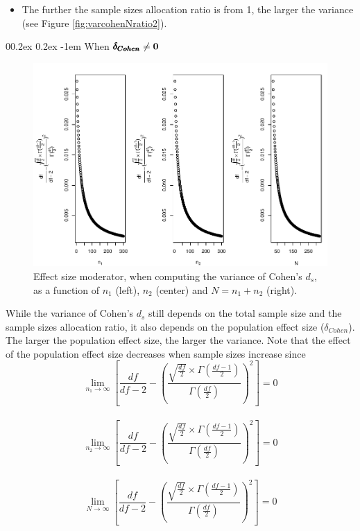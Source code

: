 \documentclass[
  english,
  man]{apa6}
\makeatletter
\providecommand{\tightlist}{%
  \setlength{\itemsep}{0pt}\setlength{\parskip}{0pt}}
\let\oldparagraph\paragraph
\renewcommand{\paragraph}[1]{\oldparagraph{#1}\mbox{}}
\renewcommand{\paragraph}{\@startsection{paragraph}{4}{\parindent}%
  {0\baselineskip \@plus 0.2ex \@minus 0.2ex}%
  {-1em}%
  {\normalfont\normalsize\bfseries\itshape\typesectitle}}
\makeatother
\begin{document}
\begin{itemize}
\tightlist
\item
  The further the sample sizes allocation ratio is from 1, the larger the variance (see Figure \ref{fig:varcohenNratio2}).
\end{itemize}

\hypertarget{when-bf-pmbdelta_cohen-neq-0}{%
\paragraph{\texorpdfstring{When \(\bf \pmb{\delta_{Cohen}} \neq 0\)}{When \textbackslash bf \textbackslash pmb\{\textbackslash delta\_\{Cohen\}\} \textbackslash neq 0}}\label{when-bf-pmbdelta_cohen-neq-0}}

\begin{figure}
\centering
\includegraphics{Theoretical-Variance-of-all-estimators-as-a-function-of-population-parameters_files/figure-latex/ESmoderatorcohenNsize2-1.pdf}
\caption{\label{fig:ESmoderatorcohenNsize2}Effect size moderator, when computing the variance of Cohen's \(d_s\), as a function of \(n_1\) (left), \(n_2\) (center) and \(N=n_1+n_2\) (right).}
\end{figure}

While the variance of Cohen's \(d_s\) still depends on the total sample size and the sample sizes allocation ratio, it also depends on the population effect size (\(\delta_{Cohen}\)). The larger the population effect size, the larger the variance. Note that the effect of the population effect size decreases when sample sizes increase since
\[\lim_{n_1\rightarrow \infty}\left[\frac{df}{df-2} - \left( \frac{\sqrt{\frac{df}{2}} \times \Gamma \left(\frac{df-1}{2} \right)}{\Gamma \left( \frac{df}{2}\right)}\right)^2 \right]=0\]\\
\[\lim_{n_2\rightarrow \infty}\left[\frac{df}{df-2} - \left( \frac{\sqrt{\frac{df}{2}} \times \Gamma \left(\frac{df-1}{2} \right)}{\Gamma \left( \frac{df}{2}\right)}\right)^2 \right]=0\]\\
\[\lim_{N\rightarrow \infty}\left[\frac{df}{df-2} - \left( \frac{\sqrt{\frac{df}{2}} \times \Gamma \left(\frac{df-1}{2} \right)}{\Gamma \left( \frac{df}{2}\right)}\right)^2 \right]=0\]
\end{document}

